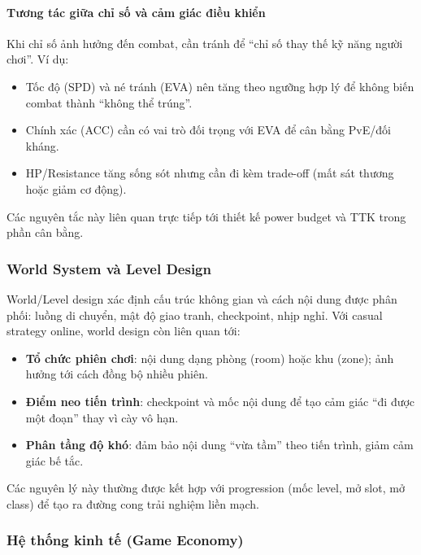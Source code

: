 \paragraph{Tương tác giữa chỉ số và cảm giác điều khiển}
Khi chỉ số ảnh hưởng đến combat, cần tránh để ``chỉ số thay thế kỹ năng người chơi''. Ví dụ:
\begin{itemize}
    \item Tốc độ (SPD) và né tránh (EVA) nên tăng theo ngưỡng hợp lý để không biến combat thành ``không thể trúng''.
    \item Chính xác (ACC) cần có vai trò đối trọng với EVA để cân bằng PvE/\allowbreak đối kháng.
    \item HP/\allowbreak Resistance tăng sống sót nhưng cần đi kèm trade-off (mất sát thương hoặc giảm cơ động).
\end{itemize}
Các nguyên tắc này liên quan trực tiếp tới thiết kế power budget và TTK trong phần cân bằng.

\subsubsection{World System và Level Design}

World/\allowbreak Level design xác định cấu trúc không gian và cách nội dung được phân phối: luồng di chuyển, mật độ giao tranh, checkpoint, nhịp nghỉ\cite{schell-art}. Với casual strategy online, world design còn liên quan tới:
\begin{itemize}
    \item \textbf{Tổ chức phiên chơi}: nội dung dạng phòng (room) hoặc khu (zone); ảnh hưởng tới cách đồng bộ nhiều phiên.
    \item \textbf{Điểm neo tiến trình}: checkpoint và mốc nội dung để tạo cảm giác ``đi được một đoạn'' thay vì cày vô hạn.
    \item \textbf{Phân tầng độ khó}: đảm bảo nội dung ``vừa tầm'' theo tiến trình, giảm cảm giác bế tắc.
\end{itemize}
Các nguyên lý này thường được kết hợp với progression (mốc level, mở slot, mở class) để tạo ra đường cong trải nghiệm liền mạch.

\subsubsection{Hệ thống kinh tế (Game Economy)}

